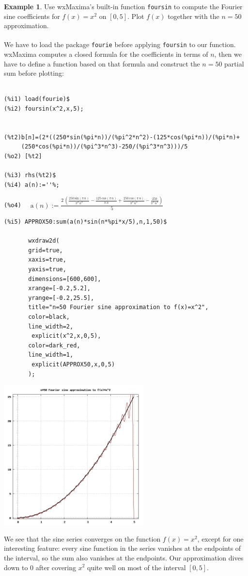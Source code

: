 \documentclass[10.5pt,twoside]{report}
\theoremstyle{definition}
\newtheorem{exmp}{Example}[section]
\begin{document}
\begin{exmp} Use wxMaxima's built-in function \verb|foursin| to compute the Fourier sine coefficients for $f(x)=x^2$ on $[0,5]$.  Plot $f(x)$ together with the $n=50$ approximation.\\
${}$\\
We have to load the package \verb|fourie| before applying \verb|foursin| to our function.  wxMaxima computes a closed formula for the coefficients in terms of $n$, then we have to define a function based on that formula and construct the $n=50$ partial sum before plotting:


\begin{verbatim}

(%i1) load(fourie)$
(%i2) foursin(x^2,x,5);


(%t2)b[n]=(2*((250*sin(%pi*n))/(%pi^2*n^2)-(125*cos(%pi*n))/(%pi*n)+
     (250*cos(%pi*n))/(%pi^3*n^3)-250/(%pi^3*n^3)))/5
(%o2) [%t2]

(%i3) rhs(%t2)$
(%i4) a(n):=''%;

\end{verbatim}

\verb|(%o4)  | $\mathrm{a}\left( n\right) :=\frac{2\,\left( \frac{250\,\mathrm{sin}\left( \pi \,n\right) }{{\pi }^{2}\,{n}^{2}}-\frac{125\,\mathrm{cos}\left( \pi \,n\right) }{\pi \,n}+\frac{250\,\mathrm{cos}\left( \pi \,n\right) }{{\pi }^{3}\,{n}^{3}}-\frac{250}{{\pi }^{3}\,{n}^{3}}\right) }{5}$


\begin{verbatim}
(%i5) APPROX50:sum(a(n)*sin(n*%pi*x/5),n,1,50)$

       wxdraw2d(
       grid=true,
       xaxis=true,
       yaxis=true,
       dimensions=[600,600],
       xrange=[-0.2,5.2],
       yrange=[-0.2,25.5],
       title="n=50 Fourier sine approximation to f(x)=x^2",
       color=black,
       line_width=2,
        explicit(x^2,x,0,5),
       color=dark_red,
       line_width=1,
        explicit(APPROX50,x,0,5)
       );
\end{verbatim}


\includegraphics[width=3in]{example_6_5_3_1}

We see that the sine series converges on the function $f(x)=x^2$, except for one interesting feature:  every sine function in the series vanishes at the endpoints of the interval, so the sum also vanishes at the endpoints. Our approximation dives down to 0 after covering $x^2$ quite well on most of the interval $[0,5]$.

\end{exmp}
\end{document}
